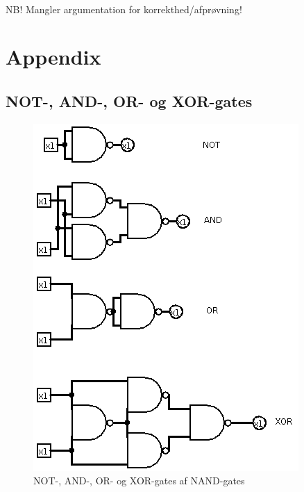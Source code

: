 \documentclass[10pt,a4paper,danish]{article}
\begin{document}
\paragraph{}
NB! Mangler argumentation for korrekthed/afprøvning!

\section{Appendix}

\subsection{NOT-, AND-, OR- og XOR-gates}
\begin{figure}[htb]
\begin{center}
\leavevmode
\includegraphics[scale=0.70]{circ1.png}
\end{center}
\caption{NOT-, AND-, OR- og XOR-gates af NAND-gates}
\label{fig:circ1} 
\end{figure}
\end{document}
